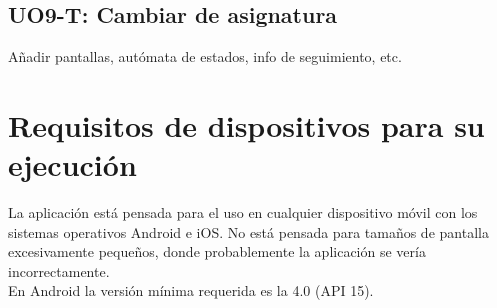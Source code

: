 \subsection{UO9-T: Cambiar de asignatura}
\label{analisis-de-requisitos:funcionales:uo9t}

Añadir pantallas, autómata de estados, info de seguimiento, etc.\\

\section{Requisitos de dispositivos para su ejecución}
\label{analisis-de-requisitos:dispositivos}

La aplicación está pensada para el uso en cualquier dispositivo móvil con los sistemas operativos Android e iOS. No está pensada para tamaños de pantalla excesivamente pequeños, donde probablemente la aplicación se vería incorrectamente.\\

En Android la versión mínima requerida es la 4.0 (API 15).\\